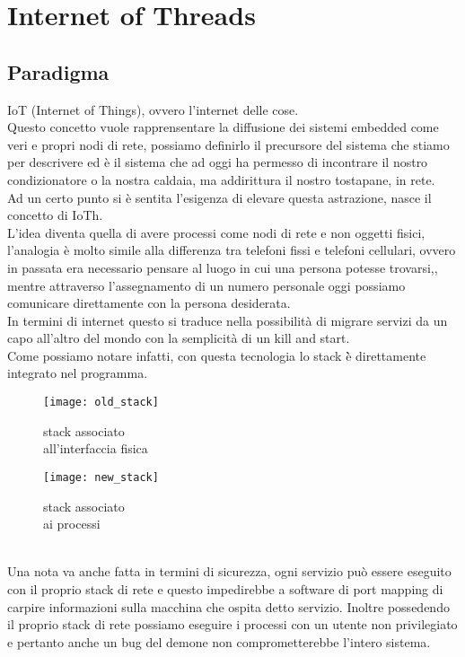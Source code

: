 \chapter{Internet of Threads}                %
\lhead[\fancyplain{}{\bfseries\thepage}]{\fancyplain{}{\bfseries\rightmark}}
\section{Paradigma}                 %
IoT (Internet of Things), ovvero l'internet delle cose.\\
Questo concetto vuole rapprensentare la diffusione dei sistemi embedded come veri e propri nodi di rete, possiamo definirlo il precursore del sistema che stiamo per descrivere ed \`e il sistema che ad oggi ha permesso di incontrare il nostro condizionatore o la nostra caldaia, ma addirittura il nostro tostapane, in rete.\\
Ad un certo punto si \`e sentita l'esigenza di elevare questa astrazione, nasce il concetto di IoTh.\\
L'idea diventa quella di avere processi come nodi di rete e non oggetti fisici, l'analogia \`e molto simile alla differenza tra telefoni fissi e telefoni cellulari, ovvero in passata era necessario pensare al luogo in cui una persona potesse trovarsi,, mentre attraverso l'assegnamento di un numero personale oggi possiamo comunicare direttamente con la persona desiderata\cite{K1,K2}.\\
In termini di internet questo si traduce nella possibilit\`a di migrare servizi da un capo all'altro del mondo con la semplicit\`a di un kill and start.\\
Come possiamo notare infatti, con questa tecnologia lo stack \`è direttamente integrato nel programma.
\begin{figure}[h]
\centering
\begin{minipage}{.5\textwidth}
\centering
\texttt{[image: old\_stack]}
\caption[physical interface stack]{stack associato\\ all'interfaccia fisica}\label{fig:fisical}
\end{minipage}%
\begin{minipage}{.5\textwidth}
\centering
\texttt{[image: new\_stack]}
\caption[virtual stack]{stack associato\\ ai processi}\label{fig:virtual}
\end{minipage}
\end{figure}\\
Una nota va anche fatta in termini di sicurezza, ogni servizio pu\`o essere eseguito con il proprio stack di rete e questo impedirebbe a software di port mapping di carpire informazioni sulla macchina che ospita detto servizio. Inoltre possedendo il proprio stack di rete possiamo eseguire i processi con un utente non privilegiato e pertanto anche un bug del demone non comprometterebbe l'intero sistema.

